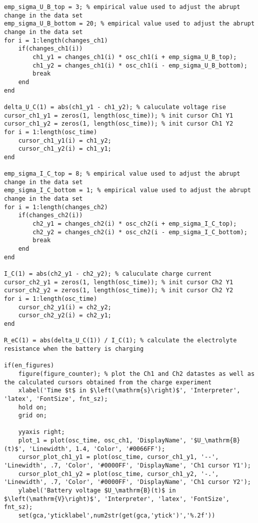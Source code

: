 \begin{lstlisting}
emp_sigma_U_B_top = 3; % empirical value used to adjust the abrupt change in the data set
emp_sigma_U_B_bottom = 20; % empirical value used to adjust the abrupt change in the data set
for i = 1:length(changes_ch1)                                             
    if(changes_ch1(i))                                                    
        ch1_y1 = changes_ch1(i) * osc_ch1(i + emp_sigma_U_B_top);       
        ch1_y2 = changes_ch1(i) * osc_ch1(i - emp_sigma_U_B_bottom);      
        break
    end
end

delta_U_C(1) = abs(ch1_y1 - ch1_y2); % caluculate voltage rise
cursor_ch1_y1 = zeros(1, length(osc_time)); % init cursor Ch1 Y1
cursor_ch1_y2 = zeros(1, length(osc_time)); % init cursor Ch1 Y2
for i = 1:length(osc_time)
    cursor_ch1_y1(i) = ch1_y2;
    cursor_ch1_y2(i) = ch1_y1;
end  

emp_sigma_I_C_top = 8; % empirical value used to adjust the abrupt change in the data set
emp_sigma_I_C_bottom = 1; % empirical value used to adjust the abrupt change in the data set
for i = 1:length(changes_ch2)
    if(changes_ch2(i))
        ch2_y1 = changes_ch2(i) * osc_ch2(i + emp_sigma_I_C_top);
        ch2_y2 = changes_ch2(i) * osc_ch2(i - emp_sigma_I_C_bottom);
        break
    end
end

I_C(1) = abs(ch2_y1 - ch2_y2); % caluculate charge current
cursor_ch2_y1 = zeros(1, length(osc_time)); % init cursor Ch2 Y1
cursor_ch2_y2 = zeros(1, length(osc_time)); % init cursor Ch2 Y2
for i = 1:length(osc_time) 
    cursor_ch2_y1(i) = ch2_y2;
    cursor_ch2_y2(i) = ch2_y1;
end

R_eC(1) = abs(delta_U_C(1)) / I_C(1); % calculate the electrolyte resistance when the battery is charging

if(en_figures)
    figure(figure_counter); % plot the Ch1 and Ch2 datastes as well as the calculated cursors obtained from the charge experiment
    xlabel('Time $t$ in $\left(\mathrm{s}\right)$', 'Interpreter', 'latex', 'FontSize', fnt_sz);
    hold on;
    grid on;

    yyaxis right;
    plot_1 = plot(osc_time, osc_ch1, 'DisplayName', '$U_\mathrm{B}(t)$', 'Linewidth', 1.4, 'Color', '#0066FF');
    cursor_plot_ch1_y1 = plot(osc_time, cursor_ch1_y1, '--', 'Linewidth', .7, 'Color', '#0000FF', 'DisplayName', 'Ch1 cursor Y1');
    cursor_plot_ch1_y2 = plot(osc_time, cursor_ch1_y2, '-.', 'Linewidth', .7, 'Color', '#0000FF', 'DisplayName', 'Ch1 cursor Y2');
    ylabel('Battery voltage $U_\mathrm{B}(t)$ in $\left(\mathrm{V}\right)$', 'Interpreter', 'latex', 'FontSize', fnt_sz);
    set(gca,'yticklabel',num2str(get(gca,'ytick')','%.2f'))


\end{lstlisting}
